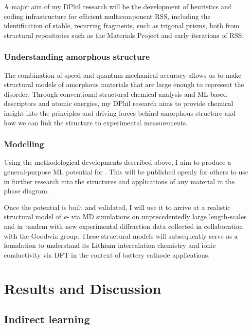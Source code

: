 \documentclass[12pt,a4paper,twoside,nobind]{ociamthesis}
\begin{document}
A major aim of my DPhil research will be the development of heuristics and coding infrastructure for efficient multicomponent RSS,
including the identification of stable, recurring fragments, such as \ce{[MoS6]} trigonal prisms, 
both from structural repositories such as the Materials Project\autocite{Jain2013} and early iterations of RSS.

\subsection*{Understanding amorphous structure}

The combination of speed and quantum-mechanical accuracy allows us to make structural models of amorphous materials that are large enough to represent the disorder.
Through conventional structural-chemical analysis and ML-based descriptors and atomic energies, my DPhil research aims to provide chemical insight into the principles and driving forces
behind amorphous structure and how we can link the structure to experimental measurements.

\subsection*{Modelling }

Using the methodological developments described above, I aim to produce a general-purpose ML potential for .
This will be published openly for others to use in further research into the structures and applications of any material in the  phase diagram.
    
Once the potential is built and validated, I will use it to arrive at a realistic structural model of \textit{a}-
via MD simulations on unprecedentedly large length-scales and in tandem with new experimental diffraction data collected in collaboration with the Goodwin group.
These structural models will subsequently serve as a foundation to understand its Lithium intercalation chemistry and ionic conductivity
 via DFT in the context of battery cathode applications.

%
\chapter{Results and Discussion} \label{chap:theory}
%
\section{Indirect learning}
\end{document}
